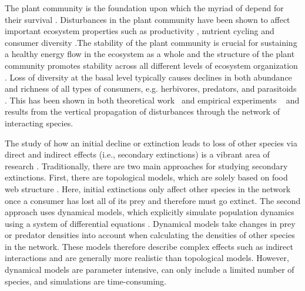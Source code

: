 \documentclass[12pt]{article}
\begin{document}
\begin{spacing}{2.0}
     The plant community is the foundation upon which the myriad of depend for their survival \citep{}. Disturbances in the plant community have been shown to affect important ecosystem properties such as productivity \citep{}, nutrient cycling \citep{} and consumer diversity \citep{scherber2010bottom}.The stability of the plant community is crucial for sustaining a healthy energy flow in the ecosystem as a whole \citep{Rosenblatt2016} and the structure of the plant community promotes stability across all different levels of ecosystem organization \citep{proulx2010diversity,scherber2010bottom}. Loss of diversity at the basal level typically causes declines in both abundance and richness of all types of consumers, e.g. herbivores, predators, and parasitoids \citep{scherber2010bottom}.
     This has been shown in both theoretical work~\citep{} and empirical experiments ~\citep{} and results from the vertical propagation of disturbances through the network of interacting species.
    
    The study of how an initial decline or extinction leads to loss of other species via direct and indirect effects (i.e., secondary extinctions) is a vibrant area of research \citep{curtsdotter2011robustness, dunne2009cascading, Eklof2006}. Traditionally, there are two main approaches for studying secondary extinctions. First, there are topological models, which are solely based on food web structure \citep{dunne2009cascading}. Here, initial extinctions only affect other species in the network once a consumer has lost all of its prey and therefore must go extinct. The second approach uses dynamical models, which explicitly simulate population dynamics using a system of differential equations \citep{binzer2011susceptibility}. Dynamical models take changes in prey or predator densities into account when calculating the densities of other species in the network. These models therefore describe complex effects such as indirect interactions and are generally more realistic than topological models. However, dynamical models are parameter intensive, can only include a limited number of species, and simulations are time-consuming. 
    

\end{spacing}
\end{document}

